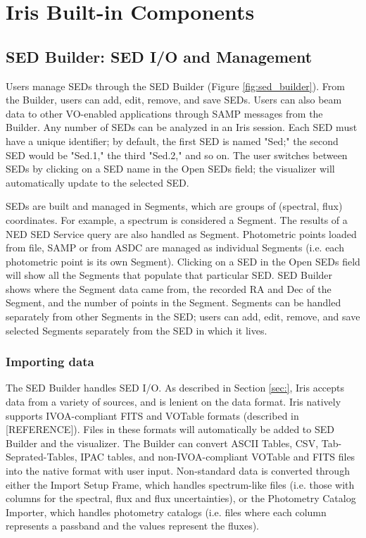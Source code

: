 \section{Iris Built-in Components}
\label{sec:components}

\subsection{SED Builder: SED I/O and Management}

Users manage SEDs through the SED Builder (Figure \ref{fig:sed_builder}). From the Builder, users can add, edit, remove, and save SEDs. Users can also beam data to other VO-enabled applications through SAMP messages from the Builder. Any number of SEDs can be analyzed in an Iris session. Each SED must have a unique identifier; by default, the first SED is named "Sed;" the second SED would be "Sed.1," the third "Sed.2," and so on. The user switches between SEDs by clicking on a SED name in the Open SEDs field; the visualizer will automatically update to the selected SED. 

SEDs are built and managed in Segments, which are groups of (spectral, flux) coordinates. For example, a spectrum is considered a Segment. The results of a NED SED Service query are also handled as Segment. Photometric points loaded from file, SAMP or from ASDC are managed as individual Segments (i.e. each photometric point is its own Segment). Clicking on a SED in the Open SEDs field will show all the Segments that populate that particular SED. SED Builder shows where the Segment data came from, the recorded RA and Dec of the Segment, and the number of points in the Segment. Segments can be handled separately from other Segments in the SED; users can add, edit, remove, and save selected Segments separately from the SED in which it lives. 

\subsubsection{Importing data}
The SED Builder handles SED I/O. As described in Section \ref{sec:}, Iris accepts data from a variety of sources, and is lenient on the data format. Iris natively supports IVOA-compliant FITS and VOTable formats (described in [REFERENCE]). Files in these formats will automatically be added to SED Builder and the visualizer. The Builder can convert ASCII Tables, CSV, Tab-Seprated-Tables, IPAC tables, and non-IVOA-compliant VOTable and FITS files into the native format with user input. Non-standard data is converted through either the Import Setup Frame, which handles spectrum-like files (i.e. those with columns for the spectral, flux and flux uncertainties), or the Photometry Catalog Importer, which handles photometry catalogs (i.e. files where each column represents a passband and the values represent the fluxes).


